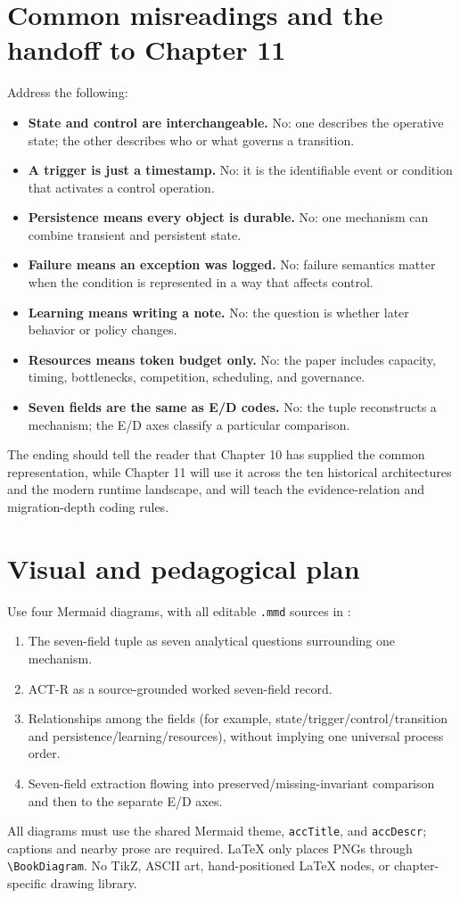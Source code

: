 \section{Common misreadings and the handoff to Chapter 11}
Address the following:
\begin{itemize}
  \item \textbf{State and control are interchangeable.} No: one describes the operative state; the other describes who or what governs a transition.
  \item \textbf{A trigger is just a timestamp.} No: it is the identifiable event or condition that activates a control operation.
  \item \textbf{Persistence means every object is durable.} No: one mechanism can combine transient and persistent state.
  \item \textbf{Failure means an exception was logged.} No: failure semantics matter when the condition is represented in a way that affects control.
  \item \textbf{Learning means writing a note.} No: the question is whether later behavior or policy changes.
  \item \textbf{Resources means token budget only.} No: the paper includes capacity, timing, bottlenecks, competition, scheduling, and governance.
  \item \textbf{Seven fields are the same as E/D codes.} No: the tuple reconstructs a mechanism; the E/D axes classify a particular comparison.
\end{itemize}
The ending should tell the reader that Chapter 10 has supplied the common representation, while Chapter 11 will use it across the ten historical architectures and the modern runtime landscape, and will teach the evidence-relation and migration-depth coding rules.

\section{Visual and pedagogical plan}
Use four Mermaid diagrams, with all editable \texttt{.mmd} sources in :
\begin{enumerate}
  \item The seven-field tuple as seven analytical questions surrounding one mechanism.
  \item ACT-R as a source-grounded worked seven-field record.
  \item Relationships among the fields (for example, state/trigger/control/transition and persistence/learning/resources), without implying one universal process order.
  \item Seven-field extraction flowing into preserved/missing-invariant comparison and then to the separate E/D axes.
\end{enumerate}
All diagrams must use the shared Mermaid theme, \texttt{accTitle}, and \texttt{accDescr}; captions and nearby prose are required. LaTeX only places PNGs through \texttt{\textbackslash BookDiagram}. No TikZ, ASCII art, hand-positioned LaTeX nodes, or chapter-specific drawing library.

